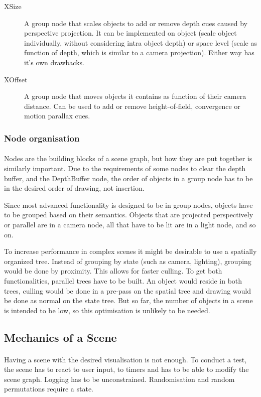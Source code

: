 \begin{description}
\item[XSize] A group node that scales objects to add or remove depth cues caused by perspective projection. It can be implemented on object (scale object individually, without considering intra object depth) or space level (scale  as function of depth, which is similar to a camera projection).
Either way has it's own drawbacks.
\item[XOffset] A group node that moves objects it contains as function of their camera distance.
Can be used to add or remove height-of-field, convergence or motion parallax cues.
\end{description}

\subsubsection{Node organisation}
\paragraph{}
Nodes are the building blocks of a scene graph, but how they are put together is similarly important. Due to the requirements of some nodes to clear the depth buffer, and the DepthBuffer node, the order of objects in a group node has to be in the desired order of drawing, not insertion.

Since most advanced functionality is designed to be in group nodes, objects have to be grouped based on their semantics.
Objects that are projected perspectively or parallel are in a camera node,
all that have to be lit are in a light node, and so on.

To increase performance in complex scenes it might be desirable to use a spatially organized tree. Instead of grouping by state (such as camera, lighting), grouping would be done by proximity.
This allows for faster culling.
To get both functionalities, parallel trees have to be built.
An object would reside in both trees, culling would be done in a pre-pass on the spatial tree and drawing would be done as normal on the state tree.
But so far, the number of objects in a scene is intended to be low, so this optimisation is unlikely to be needed.


\subsection{Mechanics of a Scene\label{sceneMech}}
\paragraph{}
Having a scene with the desired visualisation is not enough. To conduct a test, the scene has to react to user input, to timers and has to be able to modify the scene graph. Logging has to be unconstrained. Randomisation and random permutations require a state.

